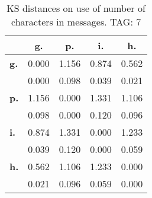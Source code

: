 \begin{table}[h!]
\begin{center}
\begin{tabular}{| l || c | c | c | c |}\hline
 & {\bf g.} & {\bf p.} & {\bf i.} & {\bf h.} \\\hline\hline
{\bf g.} & 0.000 & 1.156 & 0.874 & 0.562 \\
{\bf } & 0.000 & 0.098 & 0.039 & 0.021 \\\hline
{\bf p.} & 1.156 & 0.000 & 1.331 & 1.106 \\
{\bf } & 0.098 & 0.000 & 0.120 & 0.096 \\\hline
{\bf i.} & 0.874 & 1.331 & 0.000 & 1.233 \\
{\bf } & 0.039 & 0.120 & 0.000 & 0.059 \\\hline
{\bf h.} & 0.562 & 1.106 & 1.233 & 0.000 \\
{\bf } & 0.021 & 0.096 & 0.059 & 0.000 \\\hline
\end{tabular}
\caption{KS distances on use of number of characters in messages. TAG: 7}
\end{center}
\end{table}